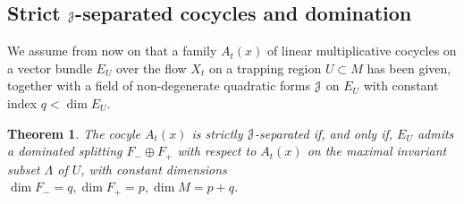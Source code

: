 \documentclass[12pt,reqno]{amsart}
\numberwithin{equation}{section}
\theoremstyle{plain}
\newtheorem{theorem}{Theorem}[section]
\newtheorem{corollary}[theorem]{Corollary}
\theoremstyle{definition}
\newcommand{\J}{\EuScript{J}}
\begin{document}





\subsection{Strict $\J$-separated cocycles and domination}
\label{sec:j-separat-cocycl}

We assume from now on that a family $A_t(x)$ of linear
multiplicative cocycles on a vector bundle $E_U$ over the
flow $X_t$ on a trapping region $U\subset M$ has been given,
together with a field of non-degenerate quadratic forms $\J$ 
on $E_U$ with constant index $q<\dim E_U$.

\begin{theorem}
  \label{thm:strict-J-separated-cocycle}
  The cocyle $A_t(x)$ is strictly
  $\J$-separated if, and only if, $E_U$ admits a
  dominated splitting $F_-\oplus F_+$ with
  respect to $A_t(x)$ on the maximal invariant subset
  $\Lambda$ of $U$, with constant
  dimensions $\dim F_-=q, \dim F_+=p, \dim M = p+q $.
\end{theorem}
\end{document}
